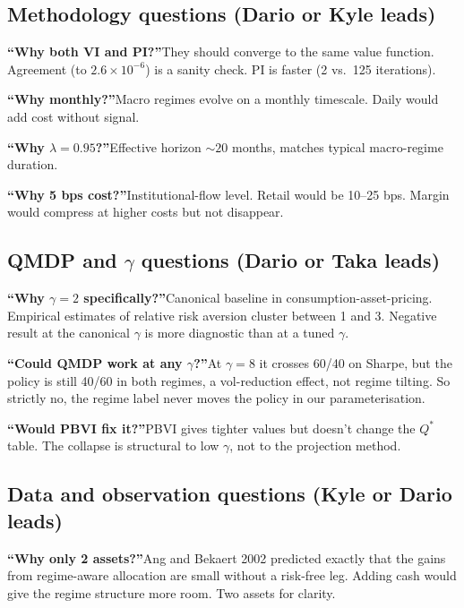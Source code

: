 \documentclass[11pt]{article}
\begin{document}
\subsection*{Methodology questions (Dario or Kyle leads)}

\textbf{``Why both VI and PI?''}\quad They should converge to the same value function. Agreement (to $2.6 \times 10^{-6}$) is a sanity check. PI is faster (2 vs.\ 125 iterations).

\textbf{``Why monthly?''}\quad Macro regimes evolve on a monthly timescale. Daily would add cost without signal.

\textbf{``Why $\lambda = 0.95$?''}\quad Effective horizon $\sim 20$ months, matches typical macro-regime duration.

\textbf{``Why 5 bps cost?''}\quad Institutional-flow level. Retail would be 10--25 bps. Margin would compress at higher costs but not disappear.

\subsection*{QMDP and $\gamma$ questions (Dario or Taka leads)}

\textbf{``Why $\gamma = 2$ specifically?''}\quad Canonical baseline in consumption-asset-pricing. Empirical estimates of relative risk aversion cluster between 1 and 3. Negative result at the canonical $\gamma$ is more diagnostic than at a tuned $\gamma$.

\textbf{``Could QMDP work at any $\gamma$?''}\quad At $\gamma = 8$ it crosses 60/40 on Sharpe, but the policy is still 40/60 in both regimes, a vol-reduction effect, not regime tilting. So strictly no, the regime label never moves the policy in our parameterisation.

\textbf{``Would PBVI fix it?''}\quad PBVI gives tighter values but doesn't change the $Q^*$ table. The collapse is structural to low $\gamma$, not to the projection method.

\subsection*{Data and observation questions (Kyle or Dario leads)}

\textbf{``Why only 2 assets?''}\quad Ang and Bekaert 2002 predicted exactly that the gains from regime-aware allocation are small without a risk-free leg. Adding cash would give the regime structure more room. Two assets for clarity.
\end{document}
